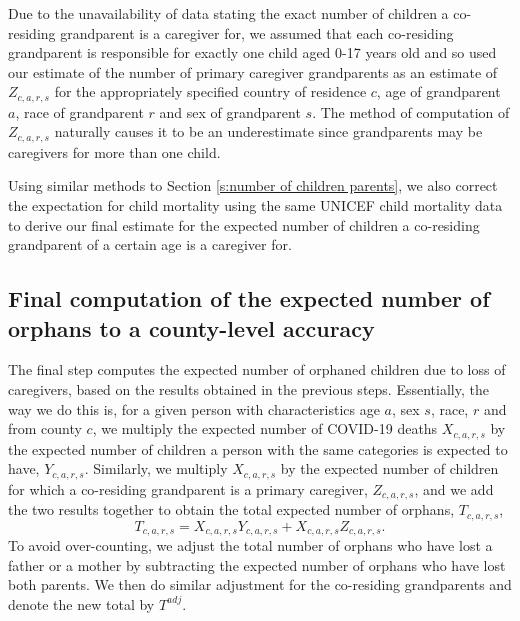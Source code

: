 \documentclass[11pt]{article}
\begin{document}
Due to the unavailability of data stating the exact number of children a co-residing grandparent is a caregiver for, we assumed that each co-residing grandparent is responsible for exactly one child aged 0-17 years old and so used our estimate of the number of primary caregiver grandparents as an estimate of $Z_{c, a, r, s}$ for the appropriately specified country of residence $c$, age of grandparent $a$, race of grandparent $r$ and sex of grandparent $s$. The method of computation of $Z_{c, a, r, s}$ naturally causes it to be an underestimate since grandparents may be caregivers for more than one child.

Using similar methods to Section \ref{s:number of children parents}, we also correct the expectation for child mortality using the same UNICEF child mortality data\cite{Child_Mortality_Data} to derive our final estimate for the expected number of children a co-residing grandparent of a certain age is a caregiver for.

\subsection{Final computation of the expected number of orphans to a county-level accuracy}\label{s:final computation}
The final step computes the expected number of orphaned children due to loss of caregivers, based on the results obtained in the previous steps. Essentially, the way we do this is, for a given person with characteristics age $a$, sex $s$, race, $r$ and from county $c$, we multiply the expected number of COVID-19 deaths  $X_{c,a,r,s}$ by the expected number of children a person with the same categories is expected to have, $Y_{c,a,r,s}$. Similarly, we multiply $X_{c,a,r,s}$ by the expected number of children for which a co-residing grandparent is a primary caregiver, $Z_{c,a,r,s}$, and we add the two results together to obtain the total expected number of orphans, $T_{c,a,r,s}$,
\begin{equation}
T_{c,a,r,s} = X_{c,a,r,s} Y_{c,a,r,s} + X_{c,a,r,s} Z_{c,a,r,s}.
\end{equation}
To avoid over-counting, we adjust the total number of orphans who have lost a father or a mother by subtracting the expected number of orphans who have lost both parents. We then do similar adjustment for the co-residing grandparents and denote the new total by $T^{adj}$.
\end{document}
